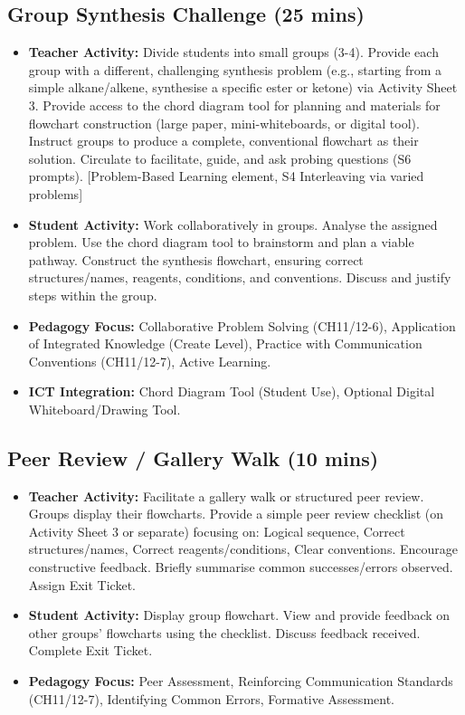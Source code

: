 \documentclass[11pt, a4paper]{article}
\begin{document}
\subsection*{Group Synthesis Challenge (25 mins)}
\begin{itemize}
    \item \textbf{Teacher Activity:} Divide students into small groups (3-4). Provide each group with a different, challenging synthesis problem (e.g., starting from a simple alkane/alkene, synthesise a specific ester or ketone) via Activity Sheet 3. Provide access to the chord diagram tool for planning and materials for flowchart construction (large paper, mini-whiteboards, or digital tool). Instruct groups to produce a complete, conventional flowchart as their solution. Circulate to facilitate, guide, and ask probing questions (S6 prompts). [Problem-Based Learning element, S4 Interleaving via varied problems]
    \item \textbf{Student Activity:} Work collaboratively in groups. Analyse the assigned problem. Use the chord diagram tool to brainstorm and plan a viable pathway. Construct the synthesis flowchart, ensuring correct structures/names, reagents, conditions, and conventions. Discuss and justify steps within the group.
    \item \textbf{Pedagogy Focus:} Collaborative Problem Solving (CH11/12-6), Application of Integrated Knowledge (Create Level), Practice with Communication Conventions (CH11/12-7), Active Learning.
    \item \textbf{ICT Integration:} Chord Diagram Tool (Student Use), Optional Digital Whiteboard/Drawing Tool.
\end{itemize}

\subsection*{Peer Review / Gallery Walk (10 mins)}
\begin{itemize}
    \item \textbf{Teacher Activity:} Facilitate a gallery walk or structured peer review. Groups display their flowcharts. Provide a simple peer review checklist (on Activity Sheet 3 or separate) focusing on: Logical sequence, Correct structures/names, Correct reagents/conditions, Clear conventions. Encourage constructive feedback. Briefly summarise common successes/errors observed. Assign Exit Ticket.
    \item \textbf{Student Activity:} Display group flowchart. View and provide feedback on other groups' flowcharts using the checklist. Discuss feedback received. Complete Exit Ticket.
    \item \textbf{Pedagogy Focus:} Peer Assessment, Reinforcing Communication Standards (CH11/12-7), Identifying Common Errors, Formative Assessment.
\end{itemize}
\end{document}
